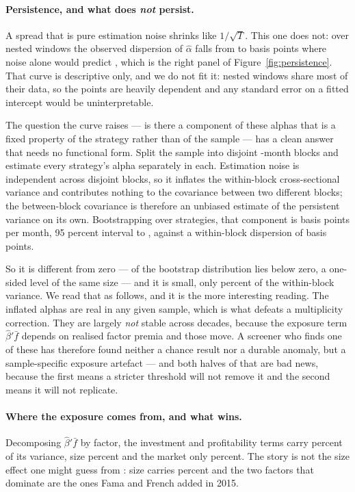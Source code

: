 \documentclass{article}
\begin{document}
\paragraph{Persistence, and what does \emph{not} persist.}
A spread that is pure estimation noise shrinks like $1/\sqrt{T}$. This one does
not: over nested windows the observed dispersion of $\hat\alpha$ falls from
\bzooamObservedAlphaBpsShort{} to \bzooamObservedAlphaBpsLong{} basis points
where noise alone would
predict \bzooamNoiseOnlyAlphaBps{}, which is the right panel of
Figure~\ref{fig:persistence}. That curve is descriptive only, and we do not
fit it: nested windows share most of their data, so the points are heavily
dependent and any standard error on a fitted intercept would be
uninterpretable.

The question the curve raises --- is there a component of these alphas that is
a fixed property of the strategy rather than of the sample --- has a clean
answer that needs no functional form. Split the sample into \bzooamNBlocks{}
disjoint \bzooamBlockMonths{}-month blocks and estimate every strategy's alpha
separately in each. Estimation noise is independent across disjoint blocks, so
it inflates the within-block cross-sectional variance and contributes nothing
to the covariance between two different blocks; the between-block covariance is
therefore an unbiased estimate of the persistent variance on its own. Bootstrapping
over strategies, that component is \bzooamPersistentBps{} basis points per
month, 95 percent interval \bzooamPersistentLoBps{} to
\bzooamPersistentHiBps{}, against a within-block dispersion of
\bzooamWithinBlockSdBps{} basis points.

So it is different from zero --- \bzooamPersistentBootP{} of the bootstrap
distribution lies below zero, a one-sided level of the same size --- and it is
small, only
\bzooamPersistentSharePct{} percent of the within-block variance. We read that
as follows, and it is the more interesting reading. The inflated alphas are
real in any given sample, which is what defeats a multiplicity correction. They
are largely \emph{not} stable across decades, because the exposure term
$\hat\beta'\bar f$ depends on realised factor premia and those move. A screener
who finds one of these has therefore found neither a chance result nor a
durable anomaly, but a sample-specific exposure artefact --- and both halves of
that are bad news, because the first means a stricter threshold will not remove
it and the second means it will not replicate.

\paragraph{Where the exposure comes from, and what wins.}
Decomposing $\hat\beta'\bar f$ by factor, the investment and profitability
terms carry \bzooamShareRmwCmaPct{} percent of its variance, size
\bzooamShareSmbPct{} percent and the market only \bzooamShareMktPct{} percent.
The story is not the size effect one might guess from
\citet{itzkowitz2016}: size carries \bzooamShareSmbPct{} percent and the two
factors that dominate are the ones Fama and French added in 2015.
\end{document}
